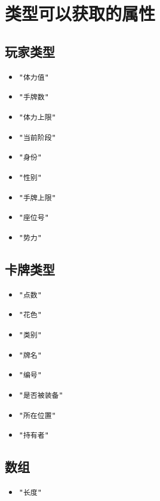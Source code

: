 \chapter{类型可以获取的属性}

\section{玩家类型}

\begin{itemize}
 \item \verb|"体力值"|
 \item \verb|"手牌数"|
 \item \verb|"体力上限"|
 \item \verb|"当前阶段"|
 \item \verb|"身份"|
 \item \verb|"性别"|
 \item \verb|"手牌上限"|
 \item \verb|"座位号"|
 \item \verb|"势力"|
\end{itemize}

\section{卡牌类型}

\begin{itemize}
 \item \verb|"点数"|
 \item \verb|"花色"|
 \item \verb|"类别"|
 \item \verb|"牌名"|
 \item \verb|"编号"|
 \item \verb|"是否被装备"|
 \item \verb|"所在位置"|
 \item \verb|"持有者"|
\end{itemize}

\section{数组}

\begin{itemize}
 \item \verb|"长度"|
\end{itemize}
